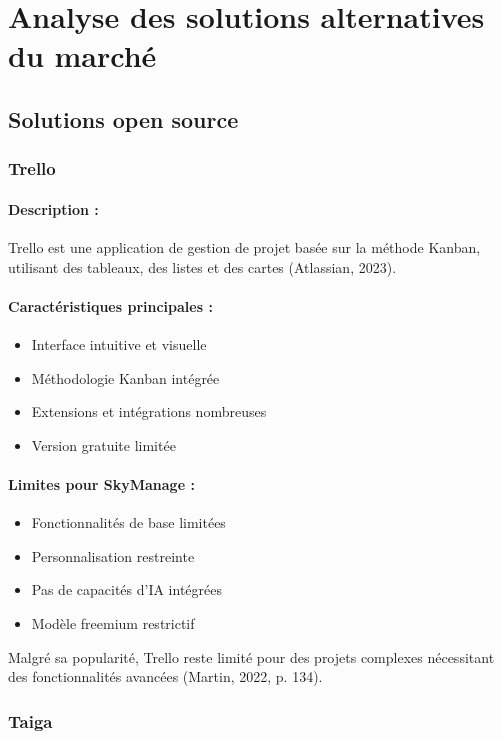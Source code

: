 \section{Analyse des solutions alternatives du marché}

\subsection{Solutions open source}

\subsubsection{Trello}
\paragraph{Description :} Trello est une application de gestion de projet basée sur la méthode Kanban, utilisant des tableaux, des listes et des cartes (Atlassian, 2023).

\paragraph{Caractéristiques principales :}
\begin{itemize}
    \item Interface intuitive et visuelle
    \item Méthodologie Kanban intégrée
    \item Extensions et intégrations nombreuses
    \item Version gratuite limitée
\end{itemize}

\paragraph{Limites pour SkyManage :}
\begin{itemize}
    \item Fonctionnalités de base limitées
    \item Personnalisation restreinte
    \item Pas de capacités d'IA intégrées
    \item Modèle freemium restrictif
\end{itemize}

Malgré sa popularité, Trello reste limité pour des projets complexes nécessitant des fonctionnalités avancées (Martin, 2022, p. 134).

\subsubsection{Taiga}
